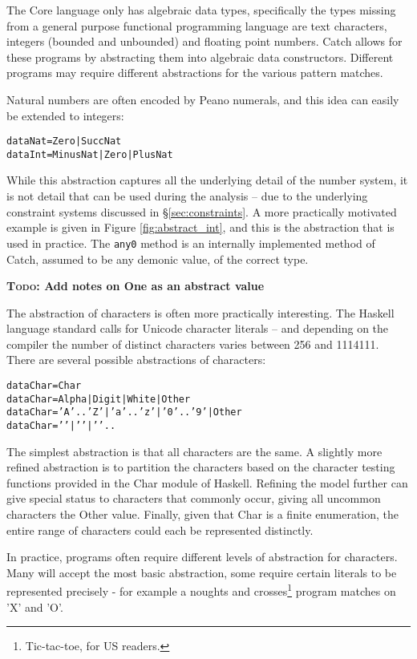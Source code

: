 \documentclass[preprint]{sigplanconf}
\newcommand{\T}[1]{\texttt{#1}}
\newcommand{\C}[1]{\textsf{#1}}
\newcommand{\todo}[1]{\textbf{\textsc{Todo:} #1}}
\newenvironment{code}{\begin{alltt}\small}{\end{alltt}}
\begin{document}
The Core language only has algebraic data types, specifically the types missing from a general purpose functional programming language are text characters, integers (bounded and unbounded) and floating point numbers. Catch allows for these programs by abstracting them into algebraic data constructors. Different programs may require different abstractions for the various pattern matches.

Natural numbers are often encoded by Peano numerals, and this idea can easily be extended to integers:

\begin{code}
data Nat  = Zero | Succ Nat
data Int  = Minus Nat | Zero | Plus Nat
\end{code}

While this abstraction captures all the underlying detail of the number system, it is not detail that can be used during the analysis -- due to the underlying constraint systems discussed in \S\ref{sec:constraints}. A more practically motivated example is given in Figure \ref{fig:abstract_int}, and this is the abstraction that is used in practice. The \T{any0} method is an internally implemented method of Catch, assumed to be any demonic value, of the correct type.

\todo{Add notes on One as an abstract value}

The abstraction of characters is often more practically interesting. The Haskell language standard calls for Unicode character literals -- and depending on the compiler the number of distinct characters varies between 256 and 1114111. There are several possible abstractions of characters:

\begin{code}
data Char = Char
data Char = Alpha | Digit | White | Other
data Char = 'A' .. 'Z' | 'a' .. 'z' | '0' .. '9' | Other
data Char = '\0' | '\1' | '\2' ..
\end{code}

The simplest abstraction is that all characters are the same. A slightly more refined abstraction is to partition the characters based on the character testing functions provided in the \C{Char} module of Haskell. Refining the model further can give special status to characters that commonly occur, giving all uncommon characters the \C{Other} value. Finally, given that \C{Char} is a finite enumeration, the entire range of characters could each be represented distinctly.

In practice, programs often require different levels of abstraction for characters. Many will accept the most basic abstraction, some require certain literals to be represented precisely - for example a noughts and crosses\footnote{Tic-tac-toe, for US readers.} program matches on 'X' and 'O'.
\end{document}
